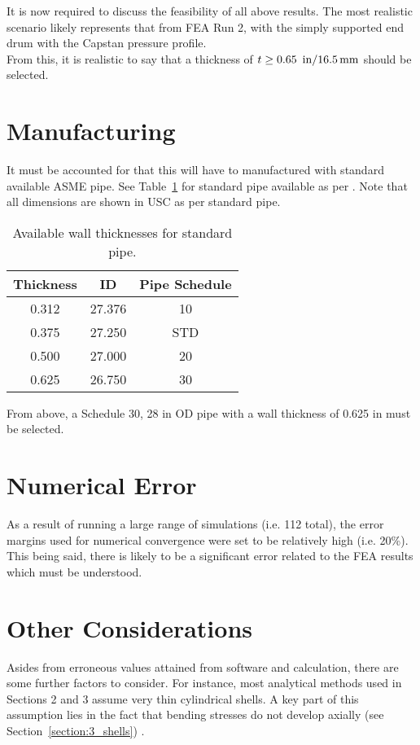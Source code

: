It is now required to discuss the feasibility of all above results. The most realistic scenario likely represents that from FEA Run 2, with the simply supported end drum with the Capstan pressure profile.\\

From this, it is realistic to say that a thickness of $t\geq 0.65\ \,\mathrm{in} /\/ 16.5\,\mathrm{mm}$ should be selected. 

\section{Manufacturing}

It must be accounted for that this will have to manufactured with standard available ASME pipe. See Table~\ref{table:5_pipe} for standard pipe available as per \cite{PIPEINFO}. Note that all dimensions are shown in USC as per standard pipe.

\begin{table}[H]
	\caption[Available wall thicknesses for standard pipe.]{Available wall thicknesses for standard pipe.\protect\cite{PIPEINFO}}
	\centering
	\begin{tabular}{ccc}
    \textbf{Thickness} & \textbf{ID} & \textbf{Pipe Schedule} \\
    \midrule
    0.312 & 27.376 & 10 \\
    0.375 & 27.250 & STD \\
    0.500 & 27.000 & 20 \\
    0.625 & 26.750 & 30 \\
    \end{tabular}%
	\label{table:5_pipe}
\end{table}

From above, a Schedule 30, 28 in OD pipe with a wall thickness of 0.625 in must be selected.

\section{Numerical Error}
\label{subsection:5_numerr}
As a result of running a large range of \cite{ANSYS} simulations (i.e. 112 total), the error margins used for numerical convergence were set to be relatively high (i.e. 20\%). This being said, there is likely to be a significant error related to the FEA results which must be understood.


\section{Other Considerations}
Asides from erroneous values attained from software and calculation, there are some further factors to consider. For instance, most analytical methods used in Sections 2 and 3 assume very thin cylindrical shells. A key part of this assumption lies in the fact that bending stresses do not develop axially (see Section~\ref{section:3_shells}) \cite{timoshenko1959theory}. \\

